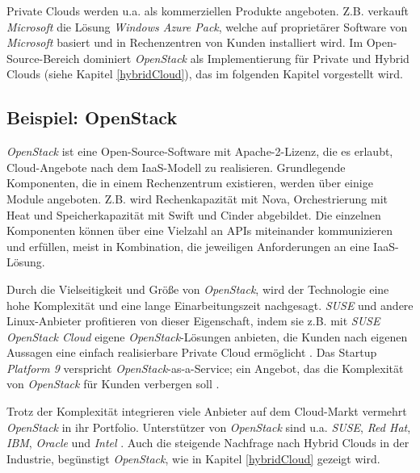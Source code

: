 \documentclass[../main.tex]{subfiles}
\begin{document}
    Private Clouds werden u.a. als kommerziellen Produkte angeboten. Z.B. verkauft \emph{Microsoft} die Lösung \emph{Windows Azure Pack}, welche auf proprietärer Software von \emph{Microsoft} basiert und in Rechenzentren von Kunden installiert wird. Im Open-Source-Bereich dominiert \emph{OpenStack} als Implementierung für Private und Hybrid Clouds (siehe Kapitel \ref{hybridCloud}), das im folgenden Kapitel vorgestellt wird.

    \subsection{Beispiel: OpenStack}
      \emph{OpenStack} ist eine Open-Source-Software mit Apache-2-Lizenz, die es erlaubt, Cloud-Angebote nach dem IaaS-Modell zu realisieren. Grundlegende Komponenten, die in einem Rechenzentrum existieren, werden über einige Module angeboten. Z.B. wird Rechenkapazität mit Nova, Orchestrierung mit Heat und Speicherkapazität mit Swift und Cinder abgebildet. Die einzelnen Komponenten können über eine Vielzahl an APIs miteinander kommunizieren und erfüllen, meist in Kombination, die jeweiligen Anforderungen an eine IaaS-Lösung.

      Durch die Vielseitigkeit und Größe von \emph{OpenStack}, wird der Technologie eine hohe Komplexität und eine lange Einarbeitungszeit nachgesagt. \emph{SUSE} und andere Linux-Anbieter profitieren von dieser Eigenschaft, indem sie z.B. mit \emph{SUSE OpenStack Cloud} eigene \emph{OpenStack}-Lösungen anbieten, die Kunden nach eigenen Aussagen eine einfach realisierbare Private Cloud ermöglicht \cite{SusePrivateCloud}\cite[S.2+4]{golemOpenStack}.
      Das Startup \emph{Platform 9} verspricht \emph{OpenStack}-as-a-Service; ein Angebot, das die Komplexität von \emph{OpenStack} für Kunden verbergen soll \cite{platform9}.

      Trotz der Komplexität integrieren viele Anbieter auf dem Cloud-Markt vermehrt \emph{OpenStack} in ihr Portfolio. Unterstützer von \emph{OpenStack} sind u.a. \emph{SUSE}, \emph{Red Hat}, \emph{IBM}, \emph{Oracle} und \emph{Intel} \cite{heiseOpenStack}\cite{IBMDockerOpenStack}. Auch die steigende Nachfrage nach Hybrid Clouds in der Industrie, begünstigt \emph{OpenStack}, wie in Kapitel \ref{hybridCloud} gezeigt wird.
\end{document}
